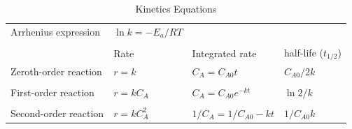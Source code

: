 \documentclass[11pt]{article}
\begin{document}
\begin{table}[htbp]
\caption{Kinetics Equations}
\centering
\begin{tabular}{llll}
\hline
Arrhenius expression & \(\ln k = -E_a/RT\) &  & \\
 &  &  & \\
 & Rate & Integrated rate & half-life  (\(t_{1/2}\))\\
\hline
Zeroth-order reaction & \(r = k\) & \(C_A = C_{A0} t\) & \(C_{A0}/2k\)\\
 &  &  & \\
First-order reaction & \(r=k C_A\) & \(C_A = C_{A0} e^{-kt}\) & \(\ln 2/k\)\\
 &  &  & \\
Second-order reaction & \(r=k C_A^2\) & \(1/C_A = 1/C_{A0} -kt\) & \(1/C_{A0} k\)\\
\hline
\end{tabular}
\end{table}
\end{document}
